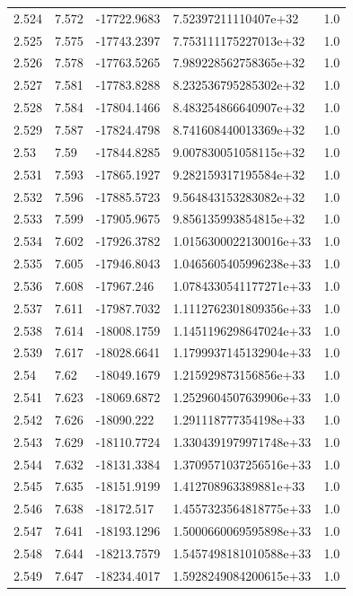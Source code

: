 \begin{tabular}{lllll}
2.524 & 7.572 & -17722.9683 & 7.52397211110407e+32 & 1.0 \\
2.525 & 7.575 & -17743.2397 & 7.753111175227013e+32 & 1.0 \\
2.526 & 7.578 & -17763.5265 & 7.989228562758365e+32 & 1.0 \\
2.527 & 7.581 & -17783.8288 & 8.232536795285302e+32 & 1.0 \\
2.528 & 7.584 & -17804.1466 & 8.483254866640907e+32 & 1.0 \\
2.529 & 7.587 & -17824.4798 & 8.741608440013369e+32 & 1.0 \\
2.53 & 7.59 & -17844.8285 & 9.007830051058115e+32 & 1.0 \\
2.531 & 7.593 & -17865.1927 & 9.282159317195584e+32 & 1.0 \\
2.532 & 7.596 & -17885.5723 & 9.564843153283082e+32 & 1.0 \\
2.533 & 7.599 & -17905.9675 & 9.856135993854815e+32 & 1.0 \\
2.534 & 7.602 & -17926.3782 & 1.0156300022130016e+33 & 1.0 \\
2.535 & 7.605 & -17946.8043 & 1.0465605405996238e+33 & 1.0 \\
2.536 & 7.608 & -17967.246 & 1.0784330541177271e+33 & 1.0 \\
2.537 & 7.611 & -17987.7032 & 1.1112762301809356e+33 & 1.0 \\
2.538 & 7.614 & -18008.1759 & 1.1451196298647024e+33 & 1.0 \\
2.539 & 7.617 & -18028.6641 & 1.1799937145132904e+33 & 1.0 \\
2.54 & 7.62 & -18049.1679 & 1.215929873156856e+33 & 1.0 \\
2.541 & 7.623 & -18069.6872 & 1.2529604507639906e+33 & 1.0 \\
2.542 & 7.626 & -18090.222 & 1.291118777354198e+33 & 1.0 \\
2.543 & 7.629 & -18110.7724 & 1.3304391979971748e+33 & 1.0 \\
2.544 & 7.632 & -18131.3384 & 1.3709571037256516e+33 & 1.0 \\
2.545 & 7.635 & -18151.9199 & 1.412708963389881e+33 & 1.0 \\
2.546 & 7.638 & -18172.517 & 1.4557323564818775e+33 & 1.0 \\
2.547 & 7.641 & -18193.1296 & 1.5000660069595898e+33 & 1.0 \\
2.548 & 7.644 & -18213.7579 & 1.5457498181010588e+33 & 1.0 \\
2.549 & 7.647 & -18234.4017 & 1.5928249084200615e+33 & 1.0 \\

\end{tabular}
